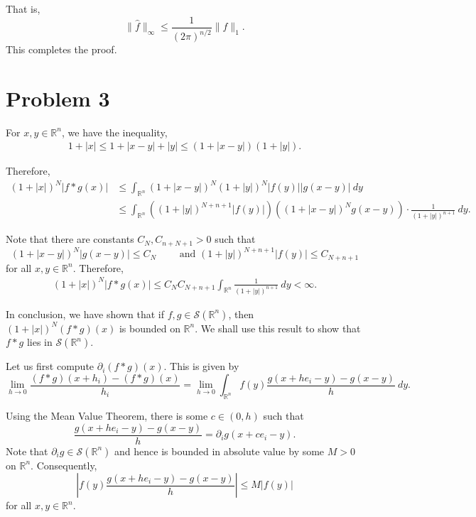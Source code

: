 \documentclass[12pt]{amsart}
\newcommand{\R}{\mathbb{R}}
\newcommand{\wh}[1]{\widehat{#1}}
\begin{document}
That is, 
\begin{equation*}
    \|\wh f\|_{\infty}\le\frac{1}{(2\pi)^{n/2}}\|f\|_1.
\end{equation*}
This completes the proof.

\section*{Problem 3}

For $x,y\in\R^n$, we have the inequality, 
\begin{align*}
    1 + |x|\le 1 + |x - y| + |y|\le (1 + |x - y|)(1 + |y|).
\end{align*}

Therefore, 
\begin{align*}
    (1 + |x|)^N |f\ast g(x)| &\le\int_{\R^n}(1 + |x - y|)^N(1 + |y|)^N |f(y)| |g(x - y)|~dy\\
    &\le\int_{\R^n}\left((1 + |y|)^{N + n + 1} |f(y)|\right)\left((1 + |x - y|)^{N}g(x - y)\right)\cdot\frac{1}{(1 + |y|)^{n + 1}}~dy.
\end{align*}

Note that there are constants $C_N, C_{n + N + 1} > 0$ such that 
\begin{equation*}
    (1 + |x - y|)^N |g(x - y)|\le C_N\qquad\text{ and } (1 + |y|)^{N + n + 1}|f(y)|\le C_{N + n + 1}
\end{equation*}
for all $x,y\in\R^n$. Therefore, 
\begin{align*}
    (1 + |x|)^N|f\ast g(x)|\le C_N C_{N + n + 1}\int_{\R^n}\frac{1}{(1 + |y|)^{n + 1}}~dy < \infty.
\end{align*}

In conclusion, we have shown that if $f, g\in \mathcal S(\R^n)$, then $(1 + |x|)^N(f\ast g)(x)$ is bounded on $\R^n$. We shall use this result to show that $f\ast g$ lies in $\mathcal S(\R^n)$. 

Let us first compute $\partial_i (f\ast g)(x)$. This is given by 
\begin{equation*}
    \lim_{h\to 0}\frac{(f\ast g)(x + h_i) - (f\ast g)(x)}{h_i} = \lim_{h\to 0}\int_{\R^n}f(y)\frac{g(x + he_i - y) - g(x - y)}{h}~dy.
\end{equation*}

Using the Mean Value Theorem, there is some $c\in (0, h)$ such that 
\begin{equation*}
    \frac{g(x + he_i - y) - g(x - y)}{h} = \partial_i g(x + ce_i - y).
\end{equation*}
Note that $\partial_i g\in\mathcal S(\R^n)$ and hence is bounded in absolute value by some $M > 0$ on $\R^n$. Consequently, 
\begin{equation*}
    \left|f(y)\frac{g(x + he_i - y) - g(x - y)}{h}\right|\le M|f(y)|
\end{equation*}
for all $x,y\in\R^n$. 
\end{document}
